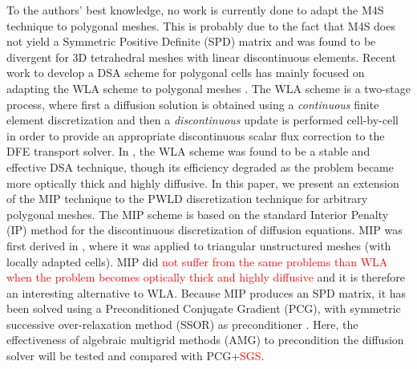 

To the authors' best knowledge, no work is currently done to adapt the M4S 
technique to polygonal meshes. This is probably due to the fact
that M4S does not yield a Symmetric Positive Definite (SPD)
matrix and was found to be divergent for 3D tetrahedral meshes with linear 
discontinuous elements. 
% 
Recent work to develop a DSA scheme for polygonal cells has mainly focused 
on adapting the WLA scheme to polygonal meshes
\cite{cfm_dfm,wla_pwl}. The WLA scheme is a two-stage process, where first a
diffusion solution is obtained using a {\em continuous} finite element
discretization and then a {\em discontinuous } update is performed cell-by-cell 
in order to provide an appropriate discontinuous scalar flux correction to the DFE transport 
solver. In \cite{consistent_p1}, the WLA scheme was
found to be a stable and effective DSA technique, though its efficiency
degraded as the problem became more optically thick and highly diffusive.
%
In this paper, we present an extension of the MIP technique to the
PWLD discretization technique for arbitrary polygonal meshes.
The MIP scheme is based on the standard Interior Penalty (IP) method for the
discontinuous discretization of diffusion equations. MIP was first derived in
\cite{mip}, where it was applied to triangular unstructured meshes (with
locally adapted cells). MIP did \textcolor{red}{not suffer from the same problems than WLA when the
problem becomes optically thick and highly diffusive} and it is therefore an
interesting alternative to WLA. Because MIP produces an SPD matrix, it has been 
solved using a Preconditioned Conjugate Gradient (PCG), with symmetric successive 
over-relaxation method (SSOR) as preconditioner \cite{mip}. Here, 
the effectiveness of algebraic multigrid methods (AMG) to precondition the diffusion
solver \cite{amg,amg_course} will be tested and compared with PCG+\textcolor{red}{SGS}.

